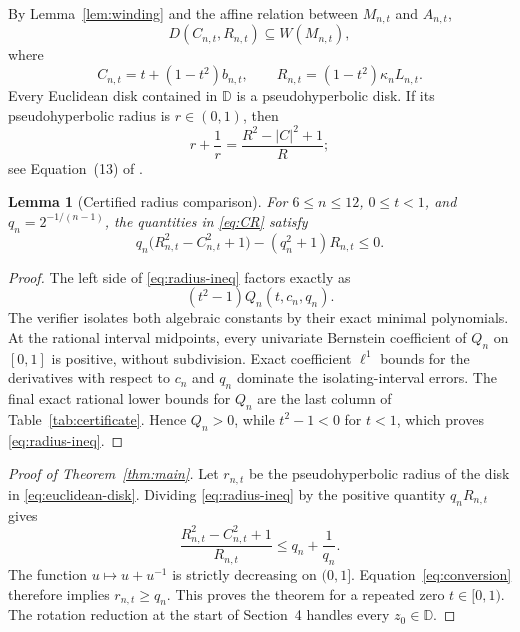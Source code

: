 \documentclass[11pt]{article}
\newtheorem{lemma}[theorem]{Lemma}
\newcommand{\D}{\mathbb D}
\begin{document}
By Lemma~\ref{lem:winding} and the affine relation between $M_{n,t}$ and
$A_{n,t}$,
\begin{equation}\label{eq:euclidean-disk}
 D(C_{n,t},R_{n,t})\subseteq W(M_{n,t}),
\end{equation}
where
\begin{equation}\label{eq:CR}
 C_{n,t}=t+(1-t^2)b_{n,t},\qquad
 R_{n,t}=(1-t^2)\kappa_nL_{n,t}.
\end{equation}
Every Euclidean disk contained in $\D$ is a pseudohyperbolic disk.  If its
pseudohyperbolic radius is $r\in(0,1)$, then
\begin{equation}\label{eq:conversion}
 r+\frac1r=\frac{R^2-|C|^2+1}{R};
\end{equation}
see Equation~(13) of \cite{BCGGV23}.

\begin{lemma}[Certified radius comparison]\label{lem:radius}
For $6\leq n\leq12$, $0\leq t<1$, and $q_n=2^{-1/(n-1)}$, the quantities
in \eqref{eq:CR} satisfy
\begin{equation}\label{eq:radius-ineq}
 q_n\bigl(R_{n,t}^2-C_{n,t}^2+1\bigr)
 -(q_n^2+1)R_{n,t}\leq0.
\end{equation}
\end{lemma}

\begin{proof}
The left side of \eqref{eq:radius-ineq} factors exactly as
\[
 (t^2-1)Q_n(t,c_n,q_n).
\]
The verifier isolates both algebraic constants by their exact minimal
polynomials.  At the rational interval midpoints, every univariate
Bernstein coefficient of $Q_n$ on $[0,1]$ is positive, without subdivision.
Exact coefficient $\ell^1$ bounds for the derivatives with respect to
$c_n$ and $q_n$ dominate the isolating-interval errors.  The final exact
rational lower bounds for $Q_n$ are the last column of
Table~\ref{tab:certificate}.  Hence $Q_n>0$, while $t^2-1<0$ for $t<1$,
which proves \eqref{eq:radius-ineq}.
\end{proof}

\begin{proof}[Proof of Theorem~\ref{thm:main}]
Let $r_{n,t}$ be the pseudohyperbolic radius of the disk in
\eqref{eq:euclidean-disk}.  Dividing \eqref{eq:radius-ineq} by the positive
quantity $q_nR_{n,t}$ gives
\[
 \frac{R_{n,t}^2-C_{n,t}^2+1}{R_{n,t}}
 \leq q_n+\frac1{q_n}.
\]
The function $u\mapsto u+u^{-1}$ is strictly decreasing on $(0,1]$.
Equation~\eqref{eq:conversion} therefore implies $r_{n,t}\geq q_n$.
This proves the theorem for a repeated zero $t\in[0,1)$.  The rotation
reduction at the start of Section~4 handles every $z_0\in\D$.
\end{proof}
\end{document}
